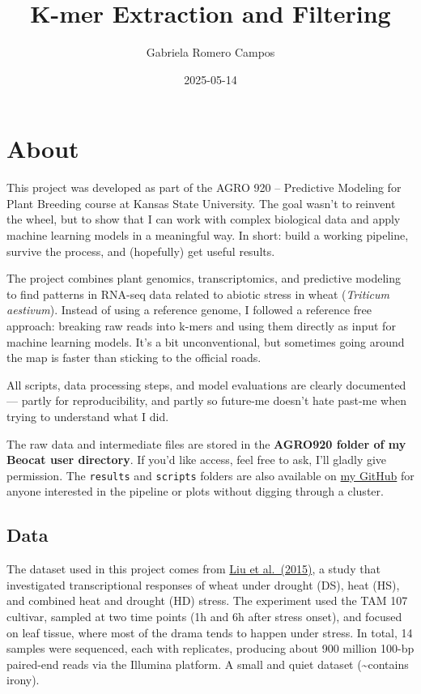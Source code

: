 \documentclass[
]{book}
\title{K-mer Extraction and Filtering}
\author{Gabriela Romero Campos}
\date{2025-05-14}
\begin{document}
\maketitle

{
\setcounter{tocdepth}{1}
\tableofcontents
}
\hypertarget{about}{%
\chapter{About}\label{about}}

This project was developed as part of the AGRO 920 -- Predictive Modeling for Plant Breeding course at Kansas State University. The goal wasn't to reinvent the wheel, but to show that I can work with complex biological data and apply machine learning models in a meaningful way. In short: build a working pipeline, survive the process, and (hopefully) get useful results.

The project combines plant genomics, transcriptomics, and predictive modeling to find patterns in RNA-seq data related to abiotic stress in wheat (\emph{Triticum aestivum}). Instead of using a reference genome, I followed a reference free approach: breaking raw reads into k-mers and using them directly as input for machine learning models. It's a bit unconventional, but sometimes going around the map is faster than sticking to the official roads.

All scripts, data processing steps, and model evaluations are clearly documented --- partly for reproducibility, and partly so future-me doesn't hate past-me when trying to understand what I did.

The raw data and intermediate files are stored in the \textbf{AGRO920 folder of my Beocat user directory}. If you'd like access, feel free to ask, I'll gladly give permission. The \texttt{results} and \texttt{scripts} folders are also available on \href{https://github.com/GRCampo/AGRO920_FinalProject.git}{my GitHub} for anyone interested in the pipeline or plots without digging through a cluster.

\hypertarget{data}{%
\section{Data}\label{data}}

The dataset used in this project comes from \href{https://doi.org/10.1186/s12870-015-0511-8}{Liu et al.~(2015)}, a study that investigated transcriptional responses of wheat under drought (DS), heat (HS), and combined heat and drought (HD) stress. The experiment used the TAM 107 cultivar, sampled at two time points (1h and 6h after stress onset), and focused on leaf tissue, where most of the drama tends to happen under stress. In total, 14 samples were sequenced, each with replicates, producing about 900 million 100-bp paired-end reads via the Illumina platform. A small and quiet dataset (\textasciitilde contains irony).
\end{document}

